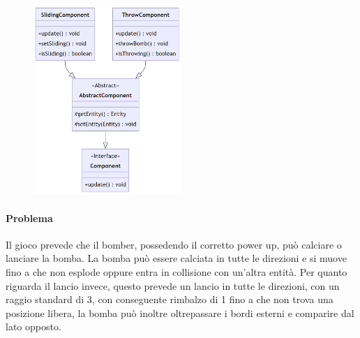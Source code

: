 \documentclass[a4paper,12pt]{report}
\begin{document}
\begin{figure}[H]
    \centering{}
    \includegraphics[width=0.5\textwidth]{img/UMLKickThrowBomb.png}
    \caption{}
    \label{}
\end{figure}

\paragraph{Problema}  Il gioco prevede che il bomber, possedendo il corretto power up, può calciare o lanciare la bomba. La bomba può essere calciata in tutte le direzioni e si muove fino a che non esplode oppure entra in collisione con un’altra entità. Per quanto riguarda il lancio invece, questo prevede un lancio in tutte le direzioni, con un raggio standard di 3, con conseguente rimbalzo di 1 fino a che non trova una posizione libera, la bomba può inoltre oltrepassare i bordi esterni e comparire dal lato opposto.
\end{document}
